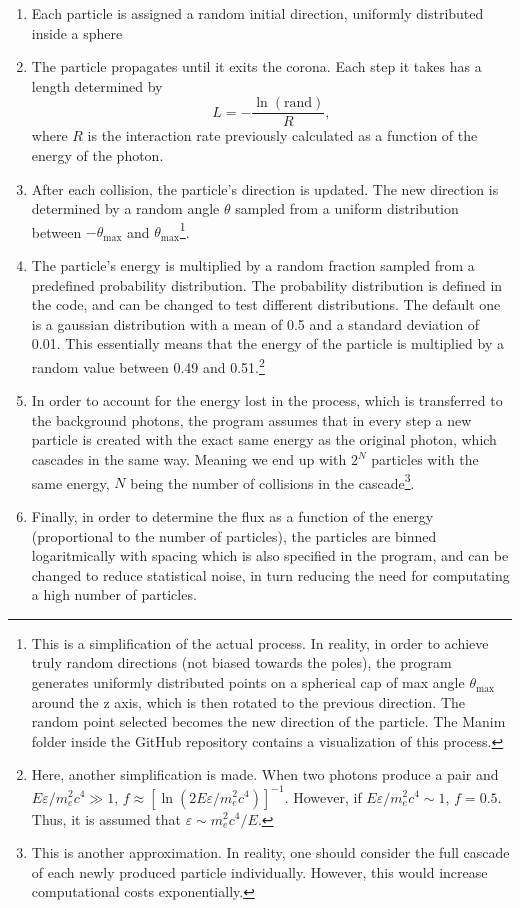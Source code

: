 \begin{enumerate}
\item Each particle is assigned a random initial direction, uniformly distributed inside a sphere
\item The particle propagates until it exits the corona. Each step it takes has a length determined by
\begin{equation}
L = -\frac{\ln (\text{rand})}{R},
\end{equation}
where $R$ is the interaction rate previously calculated as a function of the energy of the photon.
\item After each collision, the particle's direction is updated. The new direction is determined by a random angle $\theta$ sampled from a uniform distribution between $-\theta_{\max}$ and $\theta_{\max}$\footnote{This is a simplification of the actual process. In reality, in order to achieve truly random directions (not biased towards the poles), the program generates uniformly distributed points on a spherical cap of max angle $\theta_{\max}$ around the z axis, which is then rotated to the previous direction. The random point selected becomes the new direction of the particle. The Manim folder inside the GitHub repository contains a visualization of this process.}.
\item The particle's energy is multiplied by a random fraction sampled from a predefined probability distribution. The probability distribution is defined in the code, and can be changed to test different distributions. The default one is a gaussian distribution with a mean of 0.5 and a standard deviation of 0.01. This essentially means that the energy of the particle is multiplied by a random value between 0.49 and 0.51.\footnote{Here, another simplification is made. When two photons produce a pair and $E\varepsilon/m_e^2c^4\gg1$, $f\approx [\ln(2E\varepsilon/m_e^2c^4)]^{-1}$. However, if $E\varepsilon/m_e^2c^4\sim 1$, $f=0.5$. Thus, it is assumed that $\varepsilon \sim m_e^2c^4/E$.}
\item In order to account for the energy lost in the process, which is transferred to the background photons, the program assumes that in every step a new particle is created with the exact same energy as the original photon, which cascades in the same way. Meaning we end up with $2^N$ particles with the same energy, $N$ being the number of collisions in the cascade\footnote{This is another approximation. In reality, one should consider the full cascade of each newly produced particle individually. However, this would increase computational costs exponentially.}.
\item Finally, in order to determine the flux as a function of the energy (proportional to the number of particles), the particles are binned logaritmically with spacing which is also specified in the program, and can be changed to reduce statistical noise, in turn reducing the need for computating a high number of particles.
 
\end{enumerate}



